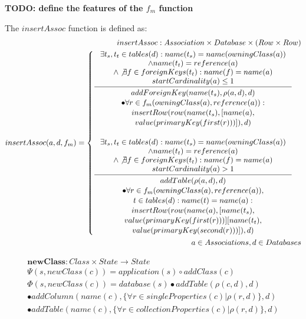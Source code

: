 \documentclass[11pt]{article}
\begin{document}
\textbf{TODO: define the features of the $f_m$ function}

The $insertAssoc$ function is defined as:
\begin{align*}
insertAssoc : Association \times Database \times (Row \times Row) \\
insertAssoc(a, d, f_m) = \begin{cases}
\inference{ \exists t_s, t_t \in tables(d) : name(t_s) = name(owningClass(a)) \\ \wedge name(t_t) = reference(a) \\ \wedge \not \exists f \in foreignKeys(t_t) : name(f) = name(a) \\ startCardinality(a) \leq 1}{\begin{gathered}
addForeignKey(name(t_s), \rho(a,d), d) \\ \bullet \forall r \in f_m(owningClass(a), reference(a)) : \\ insertRow(row(name(t_s), [name(a), \\ value(primaryKey(first(r)))]), d)
\end{gathered}
 }
 \\ \\
\inference{ \exists t_s, t_t \in tables(d) : name(t_s) = name(owningClass(a)) \\ \wedge name(t_t) = reference(a) \\ \wedge \not \exists f \in foreignKeys(t_t) : name(f) = name(a) \\ startCardinality(a) > 1}{\begin{gathered} addTable(\rho(a,d),d) \\ \bullet \forall r \in f_m(owningClass(a), reference(a)),\\ t \in tables(d) : name(t) = name(a) : \\ insertRow(row(name(a), [name(t_s), \\ value(primaryKey(first(r)))] [name(t_t), \\ value(primaryKey(second(r)))]), d)
\end{gathered}
 } 
 \end{cases}\\
 a \in Associations, d \in Databases
\end{align*}

\begin{align*}
\mathbf{newClass} : Class \times State \rightarrow State \\
\Psi(s, newClass(c)) = application(s) \circ addClass(c) \\
\Phi(s, newClass(c)) = database(s)  \bullet addTable(\rho(c,d), d) \\ \bullet addColumn(name(c), \{\forall r \in singleProperties(c) | \rho(r,d)\}, d) \\ \bullet addTable(name(c), \{\forall r \in collectionProperties(c) | \rho(r,d)\}, d)  
\end{align*}
\end{document}

